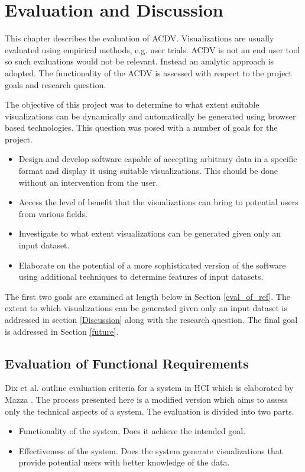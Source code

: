 \documentclass[a4paper, 11pt, titlepage, onehalfspacing]{report}
\begin{document}
\chapter{Evaluation and Discussion}
This chapter describes the evaluation of AC\lightning{}DV. Visualizations are usually evaluated using empirical methods, e.g. user trials. AC\lightning{}DV is not an end user tool so such evaluations would not be relevant. Instead an analytic approach is adopted. The functionality of the AC\lightning{}DV is assessed with respect to the project goals and research question.

The objective of this project was to determine to what extent suitable visualizations can be dynamically and automatically be generated using browser based technologies. This question was posed with a number of goals for the project. 


\begin{itemize}
\item Design and develop software capable of accepting arbitrary data in a specific format and display it using suitable visualizations. This should be done without an intervention from the user.
\item Access the level of benefit that the visualizations can bring to potential users from various fields.
\item Investigate to what extent visualizations can be generated given only an input dataset.
\item Elaborate on the potential of a more sophisticated version of the software using additional techniques to determine features of input datasets.
\end{itemize}

The first two goals are examined at length below in Section \ref{eval_of_ref}. The extent to which visualizations can be generated given only an input dataset is addressed in section \ref{Discussion} along with the research question. The final goal is addressed in Section \ref{future}.

\section{Evaluation of Functional Requirements}
\label{eval_of_req}
Dix et al. outline evaluation criteria for a system in HCI \cite{dix2004human} which is elaborated by Mazza \cite{mazza2009introduction}. The process presented here is a modified version which aims to assess only the technical aspects of a system. The evaluation is divided into two parts.
\begin{itemize}
\item Functionality of the system. Does it achieve the intended goal.
\item Effectiveness of the system. Does the system generate visualizations that provide potential users with better knowledge of the data.
\end{itemize}
\end{document}
